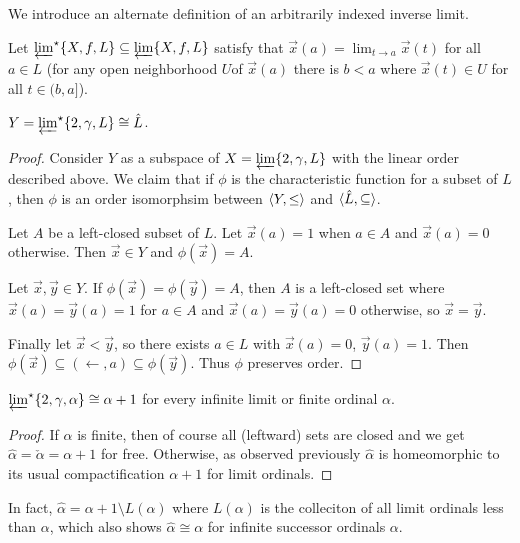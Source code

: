 \documentclass[11pt]{article}
\newcommand{\vect}{\vec}
\begin{document}
  We introduce an alternate definition of an arbitrarily indexed
  inverse limit.

  \begin{definition}
    Let \(\varprojlim^\star\{X,f,L\}\subseteq\varprojlim\{X,f,L\}\) satisfy
    that \(\vect x(a)=\lim_{t\to a}\vect x(t)\) for all \(a\in L\)
    (for any open neighborhood
    \(U\)of \(\vect x(a)\) there is \(b<a\) where \(\vect x(t)\in U\)
    for all \(t\in(b,a]\)).
  \end{definition}

  \begin{theorem}
    \(Y=\varprojlim^\star \{2, \gamma, L\}\cong \hat L\).
  \end{theorem}

  \begin{proof}
    Consider \(Y\) as a subspace of \(X=\varprojlim \{2, \gamma, L\}\) with
    the linear order described above. We claim that if \(\phi\) is the
    characteristic function for a subset of \(L\), then \(\phi\)
    is an order isomorphsim between \(\langle Y,\leq\rangle\) and
    \(\langle\hat L,\subseteq\rangle\).

    Let \(A\) be a left-closed subset of \(L\). Let \(\vect x(a)=1\) when
    \(a\in A\) and \(\vect x(a)=0\) otherwise. Then \(\vect x\in Y\) and
    \(\phi(\vect x)=A\).

    Let \(\vect x,\vect y\in Y\). If
    \(\phi(\vect x)=\phi(\vect y)=A\), then \(A\) is a
    left-closed set where \(\vect x(a)=\vect y(a)=1\) for \(a\in A\)
    and \(\vect x(a)=\vect y(a)=0\) otherwise, so \(\vect x=\vect y\).

    Finally let \(\vect x<\vect y\), so there exists \(a\in L\) with
    \(\vect x(a)=0\), \(\vect y(a)=1\). Then
    \(
      \phi(\vect x)
        \subseteq
      (\leftarrow,a)
        \subseteq
      \phi(\vect y)
    \). Thus \(\phi\) preserves order.
  \end{proof}

  \begin{corollary}
    \(
      \varprojlim^\star \{2, \gamma, \alpha\}
      \cong
      \alpha+1
    \)
    for every infinite limit or finite ordinal \(\alpha\).
  \end{corollary}

  \begin{proof}
    If \(\alpha\) is finite, then of course all (leftward) sets are
    closed and we get \(\hat\alpha=\check\alpha=\alpha+1\) for free.
    Otherwise, as observed previously \(\hat\alpha\)
    is homeomorphic to its usual compactification \(\alpha+1\) for
    limit ordinals.
  \end{proof}

  In fact, \(\hat\alpha=\alpha+1\setminus L(\alpha)\) where \(L(\alpha)\)
  is the colleciton of all limit ordinals less than \(\alpha\), which also
  shows \(\hat\alpha\cong\alpha\) for infinite successor ordinals \(\alpha\).

\newpage


\end{document}
